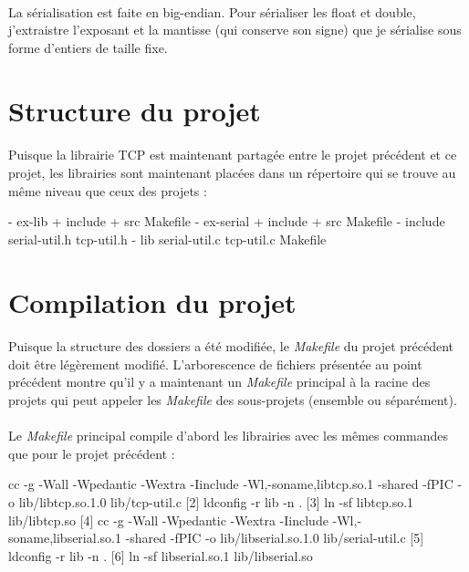 \documentclass{article}
\begin{document}
    \paragraph{}
    La sérialisation est faite en big-endian. Pour sérialiser les float et double, j'extraistre l'exposant et la mantisse (qui conserve son signe) que je sérialise sous forme d'entiers de taille fixe.

    \section{Structure du projet}
    \paragraph{}
    Puisque la librairie TCP est maintenant partagée entre le projet précédent et ce projet, les librairies sont maintenant placées dans un répertoire qui se trouve au même niveau que ceux des projets :
    \begin{verbatimtab}
        - ex-lib
            + include
            + src
            Makefile
        - ex-serial
            + include
            + src
            Makefile
        - include
            serial-util.h
            tcp-util.h
        - lib
            serial-util.c
            tcp-util.c
        Makefile
    \end{verbatimtab}


    \section{Compilation du projet}
    \paragraph{}
    Puisque la structure des dossiers a été modifiée, le \emph{Makefile} du projet précédent doit être légèrement modifié. L'arborescence de fichiers présentée au point précédent montre qu'il y a maintenant un \emph{Makefile} principal à la racine des projets qui peut appeler les \emph{Makefile} des sous-projets (ensemble ou séparément).

    \paragraph{}
    Le \emph{Makefile} principal compile d'abord les librairies avec les mêmes commandes que pour le projet précédent :
    \begin{verbatimtab}
[1]         cc -g  -Wall -Wpedantic -Wextra -Iinclude -Wl,-soname,libtcp.so.1
                -shared -fPIC -o lib/libtcp.so.1.0 lib/tcp-util.c
[2]         ldconfig -r lib -n .
[3]         ln -sf libtcp.so.1 lib/libtcp.so
[4]         cc -g  -Wall -Wpedantic -Wextra -Iinclude -Wl,-soname,libserial.so.1
                -shared -fPIC -o lib/libserial.so.1.0 lib/serial-util.c
[5]         ldconfig -r lib -n .
[6]         ln -sf libserial.so.1 lib/libserial.so
    \end{verbatimtab}
\end{document}
